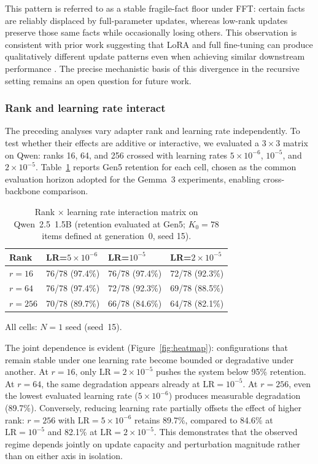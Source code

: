 \documentclass[a4paper,fleqn]{cas-dc}
\newif\ifshowchanges
\newcommand{\rev}[1]{\ifshowchanges{\color{blue}#1}\else{#1}\fi}
\begin{document}
This pattern is referred to as a stable fragile-fact floor under FFT: certain facts
are reliably displaced by full-parameter updates, whereas low-rank updates
preserve those same facts while occasionally losing others. This observation is
consistent with prior work suggesting that LoRA and full fine-tuning can produce
qualitatively different update patterns even when achieving similar downstream
performance \citep{shuttleworth2024illusion,biderman2024}. The precise
mechanistic basis of this divergence in the recursive setting remains an open
question for future work.

\subsubsection{Rank and learning rate interact}

The preceding analyses vary adapter rank and learning rate independently. To
test whether their effects are additive or interactive, we evaluated a
$3 \times 3$ matrix on Qwen: ranks 16, 64, and 256 crossed with learning rates
$5 \times 10^{-6}$, $10^{-5}$, and $2 \times 10^{-5}$. Table~\ref{tab:ranklr}
reports Gen5 retention for each cell, chosen as the common evaluation horizon
adopted for the Gemma~3 experiments, enabling cross-backbone comparison.

\begin{table}[width=.95\linewidth,cols=4,pos=htbp]
\caption{Rank $\times$ learning rate interaction matrix on Qwen~2.5~1.5B
(retention evaluated at Gen5; $K_0 = 78$ items defined at generation~0, seed 15).}\label{tab:ranklr}
\begin{tabular*}{\tblwidth}{@{} llll@{} }
\toprule
Rank & LR=$5{\times}10^{-6}$ & LR=$10^{-5}$ & LR=$2{\times}10^{-5}$ \\
\midrule
$r=16$  & 76/78 (97.4\%) & 76/78 (97.4\%) & 72/78 (92.3\%) \\
$r=64$  & 76/78 (97.4\%) & 72/78 (92.3\%) & 69/78 (88.5\%) \\
$r=256$ & 70/78 (89.7\%) & 66/78 (84.6\%) & 64/78 (82.1\%) \\
\bottomrule
\end{tabular*}
\rev{{\footnotesize All cells: $N=1$ seed (seed~15).}}
\end{table}

\rev{The joint dependence} is evident (Figure~\ref{fig:heatmap}): configurations that remain stable under one
learning rate become bounded or degradative under another. At $r=16$, only
$\mathrm{LR}=2 \times 10^{-5}$ pushes the system below 95\% retention. At
$r=64$, the same degradation appears already at $\mathrm{LR}=10^{-5}$. At
$r=256$, even the lowest evaluated learning rate ($5 \times 10^{-6}$) produces
measurable degradation (89.7\%). Conversely, reducing learning rate partially
offsets the effect of higher rank: $r=256$ with $\mathrm{LR}=5 \times 10^{-6}$
retains 89.7\%, compared to 84.6\% at $\mathrm{LR}=10^{-5}$ and 82.1\% at
$\mathrm{LR}=2 \times 10^{-5}$. This demonstrates that the observed regime
depends jointly on update capacity and perturbation magnitude rather than on
either axis in isolation.
\end{document}
